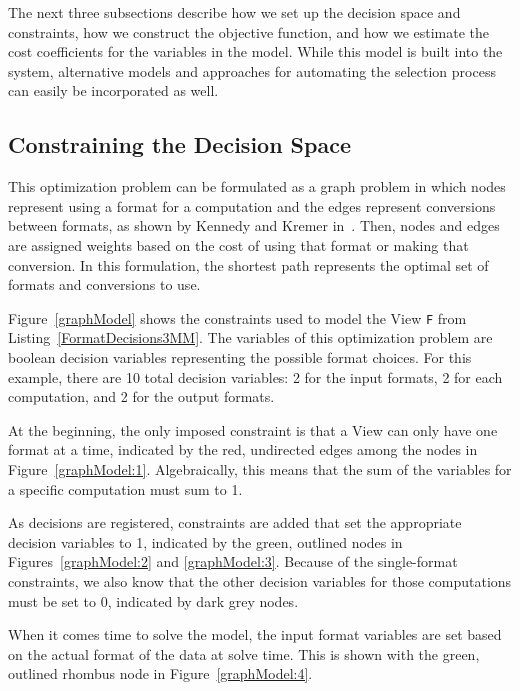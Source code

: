 The next three subsections describe how we set up the decision space and constraints, how we construct the objective function, and how we estimate the cost coefficients for the variables in the model.
While this model is built into the \FormatDecisions{} system, alternative models and approaches for automating the selection process can easily be incorporated as well.

\subsection{Constraining the Decision Space}

This optimization problem can be formulated as a graph problem in which nodes represent using a format for a computation and the edges represent conversions between formats, as shown by Kennedy and Kremer in~\cite{kennedy1998automatic}.
Then, nodes and edges are assigned weights based on the cost of using that format or making that conversion. 
In this formulation, the shortest path represents the optimal set of formats and conversions to use.

Figure~\ref{graphModel} shows the constraints used to model the View \verb.F. from Listing~\ref{FormatDecisions3MM}.
The variables of this optimization problem are boolean decision variables representing the possible format choices. 
For this example, there are 10 total decision variables: 2 for the input formats, 2 for each computation, and 2 for the output formats.

At the beginning, the only imposed constraint is that a View can only have one format at a time, indicated by the red, undirected edges among the nodes in Figure~\ref{graphModel:1}.
Algebraically, this means that the sum of the variables for a specific computation must sum to 1. 

As decisions are registered, constraints are added that set the appropriate decision variables to 1, indicated by the green, outlined nodes in Figures~\ref{graphModel:2} and \ref{graphModel:3}. 
Because of the single-format constraints, we also know that the other decision variables for those computations must be set to 0, indicated by dark grey nodes.

When it comes time to solve the model, the input format variables are set based on the actual format of the data at solve time. This is shown with the green, outlined rhombus node in Figure~\ref{graphModel:4}.




